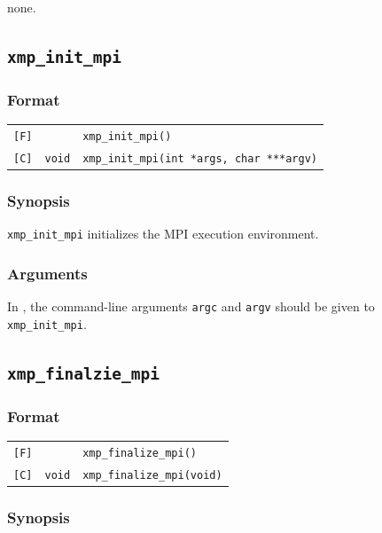 none.

\subsection{\tt xmp\_init\_mpi}

\subsubsection*{Format}

\begin{tabular}{lll}
\verb![F]!&  {\tt }& {\tt xmp\_init\_mpi()}\\

\verb![C]!&  {\tt void}& {\tt xmp\_init\_mpi(int *args, char ***argv)}
\end{tabular}

\subsubsection*{Synopsis}

   {\tt xmp\_init\_mpi} initializes the MPI execution environment.

\subsubsection*{Arguments}

   In {\XMPC}, the command-line arguments {\tt argc} and {\tt argv}
   should be given to {\tt xmp\_init\_mpi}.


\subsection{\tt xmp\_finalzie\_mpi}

\subsubsection*{Format}

\begin{tabular}{lll}
\verb![F]!&  {\tt }& {\tt xmp\_finalize\_mpi()}\\

\verb![C]!&  {\tt void}& {\tt xmp\_finalize\_mpi(void)}
\end{tabular}

\subsubsection*{Synopsis}


